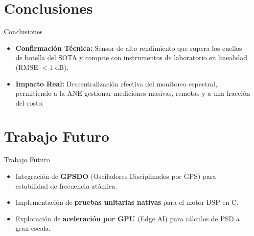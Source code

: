 \documentclass[aspectratio=169]{beamer}
\begin{document}
\section{Conclusiones}
\begin{frame}{Conclusiones}
    \begin{itemize}
        \item \textbf{Confirmación Técnica:} Sensor de alto rendimiento que supera los cuellos de botella del SOTA y compite con instrumentos de laboratorio en linealidad (RMSE $< 1$ dB).
        \item \textbf{Impacto Real:} Descentralización efectiva del monitoreo espectral, permitiendo a la ANE gestionar mediciones masivas, remotas y a una fracción del costo.
    \end{itemize}
\end{frame}

\section{Trabajo Futuro}
\begin{frame}{Trabajo Futuro}
    \begin{itemize}
        \item Integración de \textbf{GPSDO} (Osciladores Disciplinados por GPS) para estabilidad de frecuencia atómica.
        \item Implementación de \textbf{pruebas unitarias nativas} para el motor DSP en C.
        \item Exploración de \textbf{aceleración por GPU} (Edge AI) para cálculos de PSD a gran escala.
    \end{itemize}
\end{frame}
\end{document}
